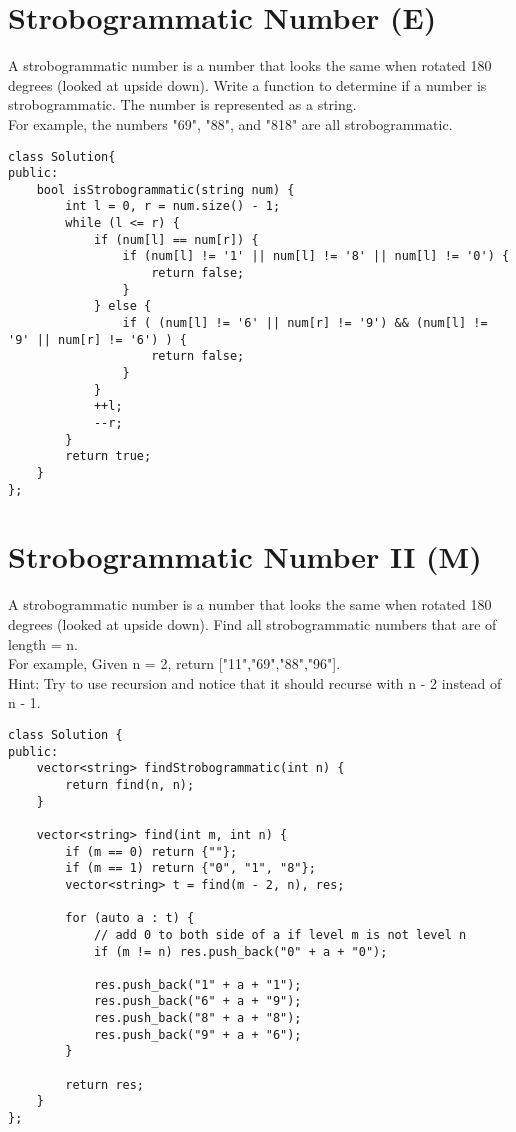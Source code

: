 \section{Strobogrammatic Number (E)}
A strobogrammatic number is a number that looks the same when rotated 180 degrees (looked at upside down). Write a function to determine if a number is strobogrammatic. The number is represented as a string.\\

For example, the numbers "69", "88", and "818" are all strobogrammatic.\\

\begin{lstlisting}
class Solution{
public:
    bool isStrobogrammatic(string num) {
        int l = 0, r = num.size() - 1;
        while (l <= r) {
            if (num[l] == num[r]) {
                if (num[l] != '1' || num[l] != '8' || num[l] != '0') {
                    return false;
                }
            } else {
                if ( (num[l] != '6' || num[r] != '9') && (num[l] != '9' || num[r] != '6') ) {
                    return false;
                }
            }
            ++l;
            --r;
        }
        return true;
    }
};
\end{lstlisting}


\section{Strobogrammatic Number II (M)}
A strobogrammatic number is a number that looks the same when rotated 180 degrees (looked at upside down). Find all strobogrammatic numbers that are of length = n.\\

For example, Given n = 2, return ["11","69","88","96"].\\

Hint: Try to use recursion and notice that it should recurse with n - 2 instead of n - 1. \\

\begin{lstlisting}
class Solution {
public:
    vector<string> findStrobogrammatic(int n) {
        return find(n, n);
    }
    
    vector<string> find(int m, int n) {
        if (m == 0) return {""};
        if (m == 1) return {"0", "1", "8"};
        vector<string> t = find(m - 2, n), res;
        
        for (auto a : t) {
            // add 0 to both side of a if level m is not level n
            if (m != n) res.push_back("0" + a + "0"); 
            
            res.push_back("1" + a + "1");
            res.push_back("6" + a + "9");
            res.push_back("8" + a + "8");
            res.push_back("9" + a + "6");
        }
        
        return res;
    }
};
\end{lstlisting}


